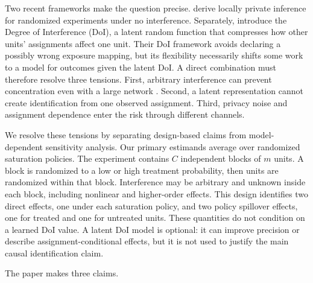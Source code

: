\documentclass[10pt]{article}
\theoremstyle{definition}
\theoremstyle{remark}
\begin{document}
Two recent frameworks make the question precise. \citet{OhnishiAwan2025} derive locally
private inference for randomized experiments under no interference. Separately,
\citet{OhnishiKarmakarSabbaghi2025} introduce the Degree of Interference (DoI), a latent random
function that compresses how other units' assignments affect one unit. Their DoI framework
avoids declaring a possibly wrong exposure mapping, but its flexibility necessarily shifts some
work to a model for outcomes given the latent DoI. A direct combination must therefore resolve
three tensions. First, arbitrary interference can prevent concentration even with a large
network \citep{BasseAiroldi2018}. Second, a latent representation cannot create identification
from one observed assignment. Third, privacy noise and assignment dependence enter the risk
through different channels.

We resolve these tensions by separating design-based claims from model-dependent sensitivity
analysis. Our
primary estimands average over randomized saturation policies. The experiment contains $C$
independent blocks of $m$ units. A block is randomized to a low or high treatment probability,
then units are randomized within that block. Interference may be arbitrary and unknown inside
each block, including nonlinear and higher-order effects. This design identifies two direct
effects, one under each saturation policy, and two policy spillover effects, one for treated and
one for untreated units. These quantities do not condition on a learned DoI value. A latent DoI
model is optional: it can improve precision or describe assignment-conditional effects, but it
is not used to justify the main causal identification claim.

The paper makes three claims.
\end{document}
